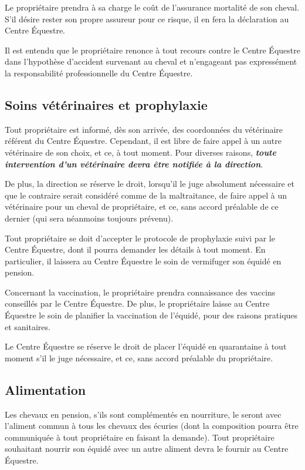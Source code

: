 \documentclass[11pt,a4paper]{article}
\renewcommand{\emph}[1]{\textit{\textbf{#1}}}
\begin{document}
Le propriétaire prendra à sa charge le coût de l'assurance mortalité de son cheval.
S'il désire rester son propre assureur pour ce risque, il en fera la déclaration au Centre Équestre.

Il est entendu que le propriétaire renonce à tout recours contre le Centre Équestre dans l'hypothèse d'accident survenant au cheval et n'engageant pas expressément la responsabilité professionnelle du Centre Équestre.

\subsection*{Soins vétérinaires et prophylaxie}
Tout propriétaire est informé, dès son arrivée, des coordonnées du vétérinaire référent du Centre Équestre.
Cependant, il est libre de faire appel à un autre vétérinaire de son choix, et ce, à tout moment.
Pour diverses raisons, \emph{toute intervention d'un vétérinaire devra être notifiée à la direction}.

De plus, la direction se réserve le droit, lorsqu'il le juge absolument nécessaire et que le contraire serait considéré comme de la maltraitance, de faire appel à un vétérinaire pour un cheval de propriétaire, et ce, sans accord préalable de ce dernier (qui sera néanmoins toujours prévenu).

Tout propriétaire se doit d'accepter le protocole de prophylaxie suivi par le Centre Équestre, dont il pourra demander les détails à tout moment.
En particulier, il laissera au Centre Équestre le soin de vermifuger son équidé en pension.

Concernant la vaccination, le propriétaire prendra connaissance des vaccins conseillés par le Centre Équestre.
De plus, le propriétaire laisse au Centre Équestre le soin de planifier la vaccination de l'équidé, pour des raisons pratiques et sanitaires.

Le Centre Équestre se réserve le droit de placer l'équidé en quarantaine à tout moment s'il le juge nécessaire, et ce, sans accord préalable du propriétaire.

\subsection*{Alimentation}
Les chevaux en pension, s'ils sont complémentés en nourriture, le seront avec l'aliment commun à tous les chevaux des écuries (dont la composition pourra être communiquée à tout propriétaire en faisant la demande).
Tout propriétaire souhaitant nourrir son équidé avec un autre aliment devra le fournir au Centre Équestre.
\end{document}
